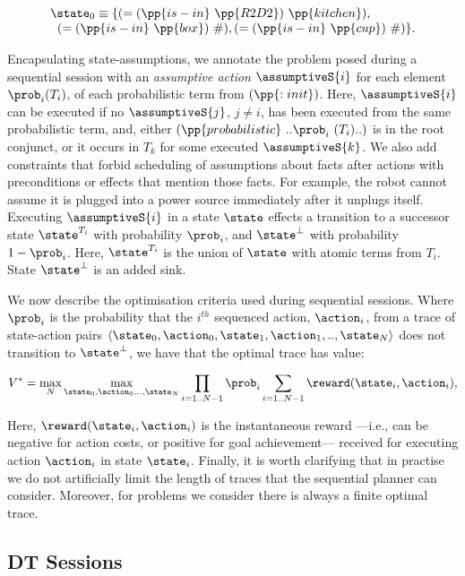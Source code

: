 \small
\[
\begin{array}{l}
\state_0 \equiv \{(=(\pp{is-in}~\pp{R2D2})~\pp{kitchen}),\\
\;\;(=(\pp{is-in}~\pp{box})~\#), (=(\pp{is-in}~\pp{cup})~\#)\}.
\end{array}
\]
\normalsize

Encapsulating state-assumptions, we annotate the problem posed during
a sequential session with an \emph{assumptive action} $\assumptiveS{i}$ for
each element $\prob_i (T_i)$, of each probabilistic term from
$(\pp{:init})$. Here, $\assumptiveS{i}$ can be executed if no
$\assumptiveS{j}$, $j \neq i$, has been executed from the same
probabilistic term, and, either
$(\pp{probabilistic}~..\prob_i~(T_i)..)$ is in the root conjunct, or
it occurs in $T_k$ for some executed $\assumptiveS{k}$.
We also add constraints that forbid scheduling of
assumptions about facts after actions with preconditions or effects
that mention those facts. For example, the robot cannot assume it is
plugged into a power source immediately after it unplugs itself.
Executing $\assumptiveS{i}$ in a state $\state$ effects a transition
to a successor state $\state^{T_i}$ with probability $\prob_i$, and
$\state^\bot$ with probability $1 - \prob_i$. Here, $\state^{T_i}$ is
the union of $\state$ with atomic terms from $T_i$. State
$\state^\bot$ is an added sink.


We now describe the optimisation criteria used during sequential
sessions. Where $\prob_i$ is the probability that the $i^{th}$
sequenced action, $\action_i$, from a trace of state-action pairs
$\langle \state_0, \action_0,\state_1, \action_1,.., \state_N \rangle$
does not transition to $\state^\bot$, we have that the optimal trace
has value:

\small
\[
V^* = \max_N \max_{\state_0, \action_0,.., \state_N} \prod_{i=1..N-1} \prob_i \sum_{i=1..N-1}
\reward(\state_i, \action_i),
\]
\normalsize

\noindent  Here,  $\reward(\state_i, \action_i)$ is the instantaneous
reward ---i.e., can be negative for action costs, or positive for goal
achievement--- received for executing action $\action_i$ in state
$\state_i$. Finally, it is worth clarifying that in practise we do not
artificially limit the length of traces that the sequential planner
can consider. Moreover, for problems we consider there is always a
finite optimal trace.

\subsection{DT Sessions}

